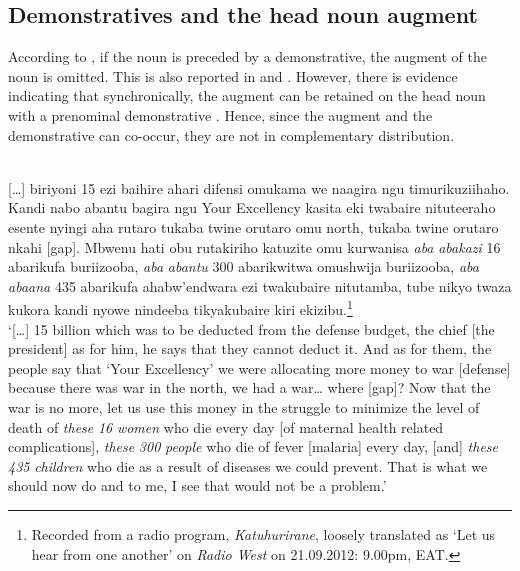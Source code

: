 \documentclass[output=paper 		  ]{langscibook}
\begin{document}
\subsection{Demonstratives and the head noun augment}\label{sec:asiimwe:3.2}

According to \citet{Taylor1985}, if the noun is preceded by a demonstrative, the augment of the noun is omitted. This is also reported in \citet{Dewees1971} and \citet{DeBlois1970}. However, there is evidence indicating that synchronically, the augment can be retained on the head noun with a prenominal demonstrative . Hence, since the augment and the demonstrative can co-occur, they are not in complementary distribution.

\eanoraggedright\sloppy%
    \label{ex:asiimwe:35} \citet[199]{Asiimwe2014}\\
    {[}…{]} biriyoni 15 ezi baihire ahari difensi omukama we naagira ngu timurikuziihaho. Kandi nabo abantu bagira ngu Your Excellency kasita eki twabaire nituteeraho esente nyingi aha rutaro tukaba twine orutaro omu north, tukaba twine orutaro nkahi [gap]. Mbwenu hati obu rutakiriho katuzite omu kurwanisa \emph{aba} \emph{abakazi} 16 abarikufa buriizooba, \emph{aba} \emph{abantu} 300 abarikwitwa omushwija buriizooba, \emph{aba} \emph{abaana} 435 abarikufa ahabw’endwara ezi twakubaire nitutamba, tube nikyo twaza kukora kandi nyowe nindeeba tikyakubaire kiri ekizibu.\footnote{Recorded from a radio program, \textit{Katuhurirane}, loosely translated as ‘Let us hear from one another’ on \textit{Radio West} on 21.09.2012: 9.00pm, EAT.}\\
‘[…] 15 billion which was to be deducted from the defense budget, the chief [the president] as for him, he says that they cannot deduct it. And as for them, the people say that ‘Your Excellency’ we were allocating more money to war [defense] because there was war in the north, we had a war… where [gap]? Now that the war is no more, let us use this money in the struggle to minimize the level of death of \emph{these} \emph{16} \emph{women} who die every day [of maternal health related complications], \emph{these} \emph{300} \emph{people} who die of fever [malaria] every day, [and] \emph{these} \emph{435} \emph{children} who die as a result of diseases we could prevent. That is what we should now do and to me, I see that would not be a problem.’
\z
\end{document}
